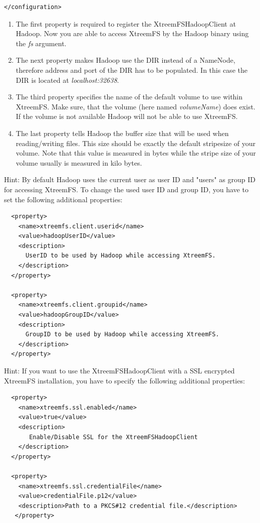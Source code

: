\documentclass[a4paper,10pt]{book}
\begin{document}
\begin{enumerate}
\begin{enumerate}
\begin{verbatim}
</configuration>
	\end{verbatim}
	\begin{enumerate}
	\item The first property is required to register the XtreemFSHadoopClient at Hadoop. Now you are able to access 	
	XtreemFS by the Hadoop binary using the \textit{fs} argument. 
	\item The next property makes Hadoop use the DIR instead of a 
	NameNode, therefore address and port of the DIR has to be populated. In this case the DIR is located at 
	\textit{localhost:32638}. 
	\item The third property specifies the name of the default volume to use within XtreemFS. Make sure, that the volume (here    	named \textit{volumeName}) does exist. If the volume is not available Hadoop will not be able to use XtreemFS.
	\item The last property tells Hadoop the buffer size that will be used when reading/writing files.
	This size should be exactly the default stripesize of your volume. Note that this value is measured in bytes while the
	stripe size of your volume usually is measured in kilo bytes. 
	\end{enumerate}
	Hint: By default Hadoop uses the current user as user ID and "users" as group ID for accessing XtreemFS. To change the used user ID and group ID, you have to set the following additional properties: 
	\begin{verbatim}
  <property>
    <name>xtreemfs.client.userid</name>
    <value>hadoopUserID</value>
    <description>
      UserID to be used by Hadoop while accessing XtreemFS.
    </description>
  </property>

  <property>
    <name>xtreemfs.client.groupid</name>
    <value>hadoopGroupID</value>
    <description>
      GroupID to be used by Hadoop while accessing XtreemFS.
    </description>
  </property>
	\end{verbatim}

		Hint: If you want to use the XtreemFSHadoopClient with a SSL encrypted XtreemFS installation, you have to specify the following additional properties: 
	\begin{verbatim}
  <property>
    <name>xtreemfs.ssl.enabled</name>
    <value>true</value>
    <description>
       Enable/Disable SSL for the XtreemFSHadoopClient
    </description>
  </property>

  <property>
    <name>xtreemfs.ssl.credentialFile</name>
    <value>credentialFile.p12</value>
    <description>Path to a PKCS#12 credential file.</description>
   </property>


\end{verbatim}
\end{enumerate}
\end{enumerate}
\end{document}
